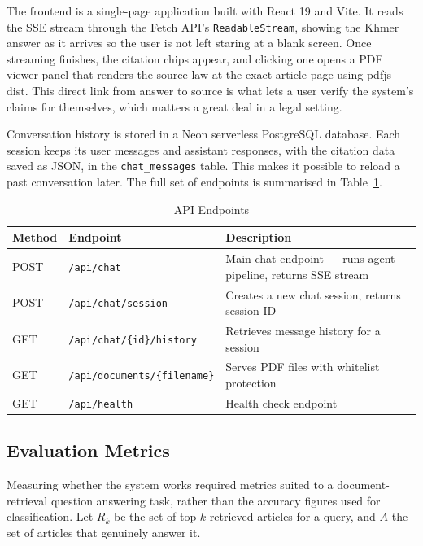 \hs The frontend is a single-page application built with React 19 and Vite. It reads the
SSE stream through the Fetch API's \texttt{ReadableStream}, showing the Khmer answer as
it arrives so the user is not left staring at a blank screen. Once streaming finishes, the
citation chips appear, and clicking one opens a PDF viewer panel that renders the source
law at the exact article page using pdfjs-dist. This direct link from answer to source is
what lets a user verify the system's claims for themselves, which matters a great deal in
a legal setting.

\hs Conversation history is stored in a Neon serverless PostgreSQL database. Each session
keeps its user messages and assistant responses, with the citation data saved as JSON, in
the \texttt{chat\_messages} table. This makes it possible to reload a past conversation
later. The full set of endpoints is summarised in Table~\ref{tab:api_endpoints}.

\begin{table}[H]
\centering
\caption{API Endpoints}
\label{tab:api_endpoints}
\begin{tabular}{llp{7cm}}
\toprule
\textbf{Method} & \textbf{Endpoint} & \textbf{Description} \\
\midrule
POST & \texttt{/api/chat} & Main chat endpoint — runs agent pipeline, returns SSE stream \\
POST & \texttt{/api/chat/session} & Creates a new chat session, returns session ID \\
GET  & \texttt{/api/chat/\{id\}/history} & Retrieves message history for a session \\
GET  & \texttt{/api/documents/\{filename\}} & Serves PDF files with whitelist protection \\
GET  & \texttt{/api/health} & Health check endpoint \\
\bottomrule
\end{tabular}
\end{table}

\subsection{Evaluation Metrics}

\hs Measuring whether the system works required metrics suited to a document-retrieval
question answering task, rather than the accuracy figures used for classification. Let
$R_k$ be the set of top-$k$ retrieved articles for a query, and $A$ the set of articles
that genuinely answer it.

